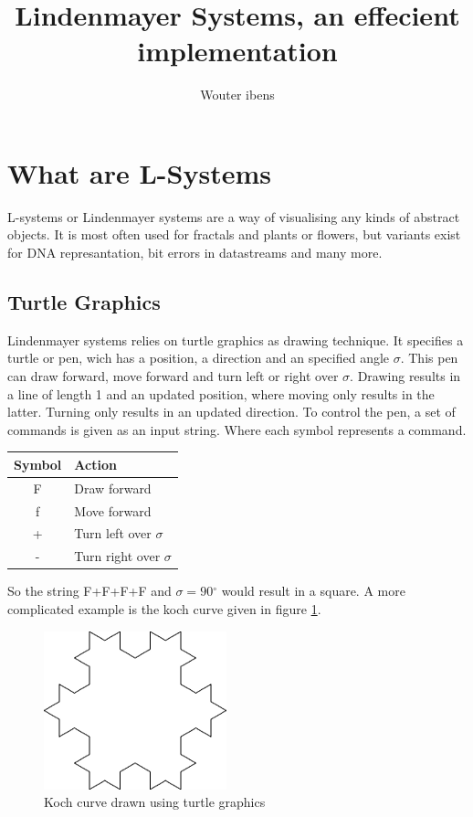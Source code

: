 \documentclass[11pt,a4paper]{article}
\author{Wouter ibens}
\title{Lindenmayer Systems, an effecient implementation}
\newcommand{\degree}{\ensuremath{^\circ}}
\begin{document}
\maketitle
\tableofcontents
\newpage
\section{What are L-Systems}
L-systems or Lindenmayer systems are a way of visualising any kinds of abstract objects. It is most often used for fractals and plants or flowers, but variants exist for DNA represantation, bit errors in datastreams and many more.

\subsection{Turtle Graphics}
Lindenmayer systems relies on turtle graphics as drawing technique. It specifies a turtle or pen, wich has a position, a direction and an specified angle $\sigma$. This pen can draw forward, move forward and turn left or right over $\sigma$. Drawing results in a line of length 1 and an updated position, where moving only results in the latter. Turning only results in an updated direction.
To control the pen, a set of commands is given as an input string. Where each symbol represents a command.
\begin{center}
\begin{tabular}{c | l}
Symbol & Action \\ \hline
F & Draw forward \\
f & Move forward \\
+ & Turn left over $\sigma$ \\
- & Turn right over $\sigma$
\end{tabular}
\end{center}

So the string F+F+F+F and $\sigma = 90\degree$ would result in a square. A more complicated example is the koch curve given in figure \ref{fig:koch}.
\begin{figure}[h!]
  \centering
  \includegraphics[]{koch.png}
  \caption{Koch curve drawn using turtle graphics}
  \label{fig:koch}
\end{figure}
\end{document}
